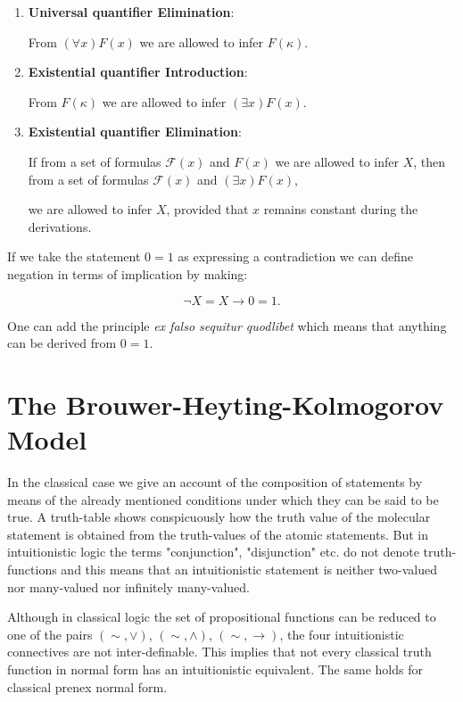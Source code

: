 \documentclass[12pt]{article}
\begin{document}
\begin{enumerate}
\medskip
\item \textbf{Universal quantifier Elimination}:

\begin{center}
From $(\forall x) F (x)$ we are allowed to infer $F (\kappa)$.
\end{center}

\medskip
\item \textbf{Existential quantifier Introduction}:

\begin{center}
From $F (\kappa)$ we are allowed to infer $(\exists x) F (x)$. 
\end{center}

\medskip
\item \textbf{Existential quantifier Elimination}:

\begin{center}
If from a set of formulas $\mathcal{F}(x)$ and $F (x)$ we are allowed to infer $X$, then from a set of formulas $\mathcal{F} (x)$ and $(\exists x) F (x)$, 

we are allowed to infer $X$, provided that $x$ remains constant during the derivations.
\end{center}

\end{enumerate}

If we take the statement $0 = 1$ as expressing a contradiction we can define negation in terms of implication by making:
 
$$\neg X = X \rightarrow 0 = 1.$$

One can add the principle \emph{ex falso sequitur quodlibet} which means that anything can be derived from $0 = 1$.

\section{The Brouwer-Heyting-Kolmogorov Model}\normalsize

In the classical case we give an account of the composition of statements by means of the already mentioned conditions under which they can be said to be true. A truth-table shows conspicuously how the truth value of the molecular statement is obtained from the truth-values of the atomic statements. But in intuitionistic logic the terms "conjunction", "disjunction" etc. do not denote truth-functions and this means that an intuitionistic statement is neither two-valued nor many-valued nor infinitely many-valued.

Although in classical logic the set of propositional functions can be reduced to one of the pairs $(\sim, \vee)$, $(\sim, \wedge)$, $(\sim, \rightarrow)$, the four intuitionistic connectives are not inter-definable. This implies that not every classical truth function in normal form has an intuitionistic equivalent. The same holds for classical prenex normal form.
\end{document}
